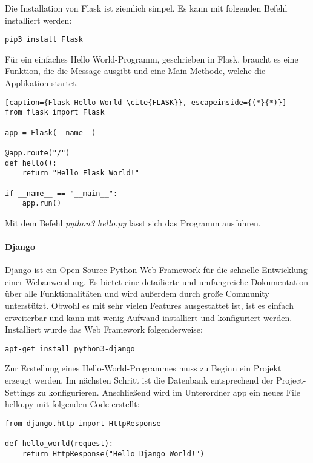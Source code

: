Die Installation von Flask ist ziemlich simpel. Es kann mit folgenden Befehl installiert werden:
\begin{lstlisting}[caption={Installation von Flask \cite{FLASK}}]
pip3 install Flask
\end{lstlisting}

Für ein einfaches \grqq{}Hello World\grqq{}-Programm, geschrieben in Flask, braucht es eine Funktion, die die Message ausgibt und eine Main-Methode, welche die Applikation startet.

\begin{lstlisting}[caption={Flask Hello-World \cite{FLASK}}, escapeinside={(*}{*)}]
from flask import Flask

app = Flask(__name__)

@app.route("/")
def hello():
	return "Hello Flask World!"

if __name__ == "__main__":
    app.run()
\end{lstlisting}

Mit dem Befehl \textit{python3 hello.py} lässt sich das Programm ausführen.

\paragraph{Django}
Django ist ein Open-Source Python Web Framework für die schnelle Entwicklung einer Webanwendung. Es bietet eine detailierte und umfangreiche Dokumentation über alle Funktionalitäten und wird außerdem durch große Community unterstützt. Obwohl es mit sehr vielen Features ausgestattet ist, ist es einfach erweiterbar und kann mit wenig Aufwand installiert und konfiguriert werden.\cite{DJANGO}\\

Installiert wurde das Web Framework folgenderweise:
\begin{lstlisting}[caption={Installation von Django\cite{DJANGOIN}}]
apt-get install python3-django
\end{lstlisting}

Zur Erstellung eines \grqq{}Hello-World\grqq{}-Programmes muss zu Beginn ein Projekt erzeugt werden. Im nächsten Schritt ist die Datenbank entsprechend der Project-Settings zu konfigurieren. Anschließend wird im Unterordner app ein neues File \grqq{}hello.py\grqq{} mit folgenden Code erstellt:

\begin{lstlisting}[caption={Django Hello-World \cite{DJANGOCODE}}]
from django.http import HttpResponse

def hello_world(request):
	return HttpResponse("Hello Django World!")
\end{lstlisting}

